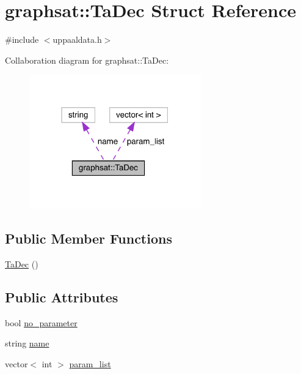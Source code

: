 \hypertarget{structgraphsat_1_1_ta_dec}{}\section{graphsat\+::Ta\+Dec Struct Reference}
\label{structgraphsat_1_1_ta_dec}


{\ttfamily \#include $<$uppaaldata.\+h$>$}



Collaboration diagram for graphsat\+::Ta\+Dec\+:
\nopagebreak
\begin{figure}[H]
\begin{center}
\leavevmode
\includegraphics[width=210pt]{structgraphsat_1_1_ta_dec__coll__graph}
\end{center}
\end{figure}
\subsection*{Public Member Functions}
\begin{DoxyCompactItemize}
\item 
\mbox{\hyperlink{structgraphsat_1_1_ta_dec_a6e8253bf059b50323c8d985a50c464d2}{Ta\+Dec}} ()
\end{DoxyCompactItemize}
\subsection*{Public Attributes}
\begin{DoxyCompactItemize}
\item 
bool \mbox{\hyperlink{structgraphsat_1_1_ta_dec_a15941b9516dd614671933014a5ac81aa}{no\+\_\+parameter}}
\item 
string \mbox{\hyperlink{structgraphsat_1_1_ta_dec_a51dafd5aa27b4dfaa180ae2edecdebf4}{name}}
\item 
vector$<$ int $>$ \mbox{\hyperlink{structgraphsat_1_1_ta_dec_a6f2e9396665ff8076056c195df40f1a0}{param\+\_\+list}}
\end{DoxyCompactItemize}


